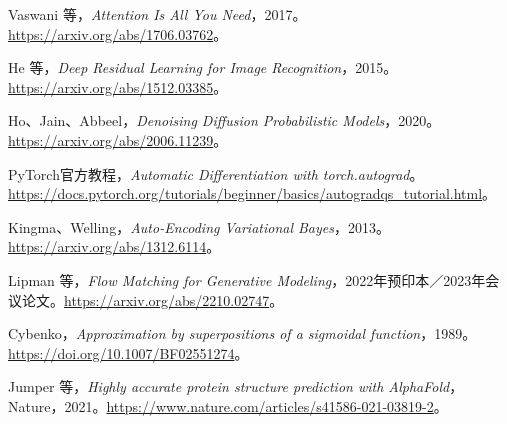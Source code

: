 \documentclass[UTF8,fontset=none,zihao=-4,a4paper]{ctexart}
\begin{document}
\begingroup\small\raggedright
\begin{enumerate}[label={[\arabic*]},leftmargin=2.5em,itemsep=4pt]
\item Vaswani 等，\textit{Attention Is All You Need}，2017。\url{https://arxiv.org/abs/1706.03762}。
\item He 等，\textit{Deep Residual Learning for Image Recognition}，2015。\url{https://arxiv.org/abs/1512.03385}。
\item Ho、Jain、Abbeel，\textit{Denoising Diffusion Probabilistic Models}，2020。\url{https://arxiv.org/abs/2006.11239}。
\item PyTorch官方教程，\textit{Automatic Differentiation with torch.autograd}。\url{https://docs.pytorch.org/tutorials/beginner/basics/autogradqs_tutorial.html}。
\item Kingma、Welling，\textit{Auto-Encoding Variational Bayes}，2013。\url{https://arxiv.org/abs/1312.6114}。
\item Lipman 等，\textit{Flow Matching for Generative Modeling}，2022年预印本／2023年会议论文。\url{https://arxiv.org/abs/2210.02747}。
\item Cybenko，\textit{Approximation by superpositions of a sigmoidal function}，1989。\url{https://doi.org/10.1007/BF02551274}。
\item Jumper 等，\textit{Highly accurate protein structure prediction with AlphaFold}，Nature，2021。\url{https://www.nature.com/articles/s41586-021-03819-2}。
\end{enumerate}
\endgroup
\end{document}

